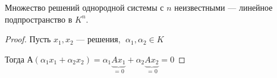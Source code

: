 \begin{theorem-non}
    Множество решений однородной системы  с $n$ неизвестными --- линейное подпространство в $K^n$.

    \begin{proof}
        Пусть $x_1, x_2$ --- решения, $\; \alpha_1, \alpha_2 \in K$    
        
        Тогда $А(\alpha_1 x_1 + \alpha_2 x_2) = \alpha_1 \underbrace{Ax_1}_{\text{ = 0}} + \alpha_2 \underbrace{Ax_2}_{\text{ = 0}} = 0$
    \end{proof}
    
\end{theorem-non}